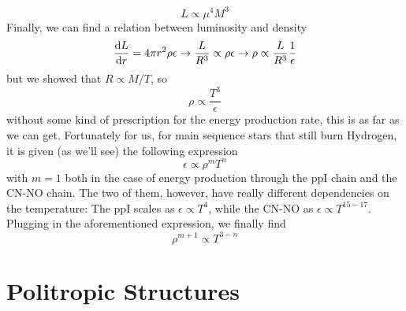 \begin{equation}
	\boxed{
		L \propto \mu^{4}M^{3}
	}
	\label{eq:luminosity_mass}
\end{equation}
Finally, we can find a relation between luminosity and density
\begin{equation*}
	\frac{\text{d}L}{\text{d}r} = 4\pi r^{2}\rho\epsilon \to \frac{L}{R^{3}} \propto \rho\epsilon \to \rho \propto \frac{L}{R^{3}}\frac{1}{\epsilon}
\end{equation*}
but we showed that $R \propto M/T$, so
\begin{equation*}
	\rho \propto \frac{T^{3}}{\epsilon}
\end{equation*}
without some kind of prescription for the energy production rate, this is as far as we can get. Fortunately for us, for main sequence stars that still burn Hydrogen, it is given (as we'll see) the following expression
\begin{equation*}
	\epsilon \propto \rho^{m}T^{n}
\end{equation*}
with $m=1$ both in the case of energy production through the $\text{ppI}$ chain and the CN-NO chain. The two of them, however, have really different dependencies on the temperature: The $\text{ppI}$ scales as $\epsilon \propto T^{4}$, while the CN-NO as $\epsilon\propto T^{15-17}$. Plugging in the aforementioned expression, we finally find
\begin{equation}
	\boxed{
	\rho^{m+1} \propto T^{3-n}
	}
	\label{eq:density_temperature}
\end{equation}

\section{Politropic Structures}

